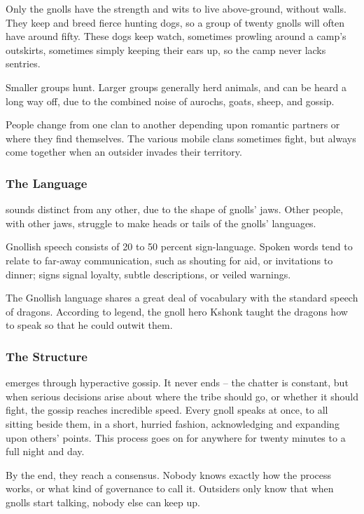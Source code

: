 \begin{multicols}{2}
\renewcommand\npcsymbol{\Nl}

\noindent
Only the gnolls have the strength and wits to live above-ground, without walls.
They keep and breed fierce hunting dogs, so a group of twenty gnolls will often have around fifty.
These dogs keep watch, sometimes prowling around a camp's outskirts, sometimes simply keeping their ears up, so the camp never lacks sentries.

Smaller groups hunt.
Larger groups generally herd animals, and can be heard a long way off, due to the combined noise of aurochs, goats, sheep, and gossip.

People change from one clan to another depending upon romantic partners or where they find themselves.
The various mobile clans sometimes fight, but always come together when an outsider invades their territory.

\subsubsection{The Language}
sounds distinct from any other, due to the shape of gnolls' jaws.
Other people, with other jaws, struggle to make heads or tails of the gnolls' languages.

Gnollish speech consists of 20 to 50 percent sign-language.
Spoken words tend to relate to far-away communication, such as shouting for aid, or invitations to dinner; signs signal loyalty, subtle descriptions, or veiled warnings.

The Gnollish language shares a great deal of vocabulary with the standard speech of dragons.
According to legend, the gnoll hero Kshonk taught the dragons how to speak so that he could outwit them.

\subsubsection{The Structure}
emerges through hyperactive gossip.
It never ends -- the chatter is constant, but when serious decisions arise about where the tribe should go, or whether it should fight, the gossip reaches incredible speed.
Every gnoll speaks at once, to all sitting beside them, in a short, hurried fashion, acknowledging and expanding upon others' points.
This process goes on for anywhere for twenty minutes to a full night and day.

By the end, they reach a consensus.
Nobody knows exactly how the process works, or what kind of governance to call it.
Outsiders only know that when gnolls start talking, nobody else can keep up.


\end{multicols}
